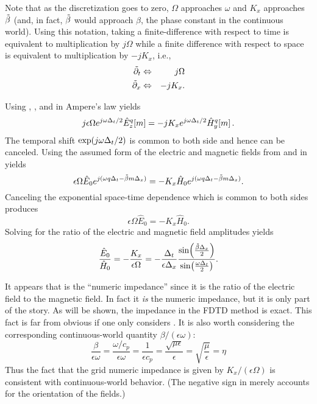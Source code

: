 Note that as the discretization goes to zero, $\Omega$ approaches
$\omega$ and $K_x$ approaches $\tilde{\beta}$ (and, in fact, $\tilde{\beta}$ would
approach $\beta$, the phase constant in the continuous world).  Using this
notation, taking a finite-difference with respect to time is
equivalent to multiplication by $j\Omega$ while a finite difference
with respect to space is equivalent to multiplication by $-jK_x$,
i.e.,
\begin{eqnarray}
  \tilde{\partial}_t &\Leftrightarrow& j\Omega \label{eq:OmegaDef} \\
  \tilde{\partial}_x &\Leftrightarrow& -jK_x.  \label{eq:KDef}
\end{eqnarray}

Using , , and
 in Ampere's law  yields
\begin{equation}
  j \epsilon \Omega e^{j\omega\Delt/2} 
    \fdtd{\hat{E}_z}{m}{q}
  =
   -j K_x e^{j\omega\Delt/2} 
    \fdtd{\hat{H}_y}{m}{q}.
  \label{eq:ampereOperator}
\end{equation}
The temporal shift $\exp(j\omega\Delta_t/2)$ is common to both side and
hence can be canceled.  Using the assumed form of the electric and
magnetic fields from  and  in
 yields
\begin{equation}
  \epsilon \Omega \hat{E}_0 e^{j(\omega q \Delta_t - \tilde{\beta} m \Delta_x)} =
   - K_x \hat{H}_0 e^{j(\omega q \Delta_t - \tilde{\beta} m \Delta_x)}.
\end{equation}
Canceling the exponential space-time dependence which is common to
both sides produces
\begin{equation}
  \epsilon \Omega \hat{E}_0 = - K_x \hat{H}_0.
\end{equation}
Solving for the ratio of the electric and magnetic field amplitudes
yields
\begin{equation}
  \frac{\hat{E}_0}{\hat{H}_0} = -\frac{K_x}{\epsilon\Omega} = 
  - \frac{\Delt}{\epsilon\Delx}
    \frac{\sin\!\left(\frac{\tbeta\Delx}{2}\right)}
       {\sin\!\left(\frac{\omega\Delt}{2}\right)}.
  \label{eq:dispAmperePart}
\end{equation}

It appears that  is the ``numeric impedance''
since it is the ratio of the electric field to the magnetic field.  In
fact it {\em is} the numeric impedance, but it is only part of the
story.  As will be shown, the impedance in the FDTD method is exact.
This fact is far from obvious if one only considers
.  It is also worth considering the
corresponding continuous-world quantity $\beta/(\epsilon\omega)$:
\begin{equation}
  \frac{\beta}{\epsilon\omega} = \frac{\omega/c_p}{\epsilon\omega}
  = \frac{1}{\epsilon c_p} =  \frac{\sqrt{\mu\epsilon}}{\epsilon}
  = \sqrt{\frac{\mu}{\epsilon}} = \eta
\end{equation}
Thus the fact that the grid numeric impedance is given by
$K_x/(\epsilon\Omega)$ is consistent with continuous-world behavior.
(The negative sign in  merely accounts for
the orientation of the fields.)

